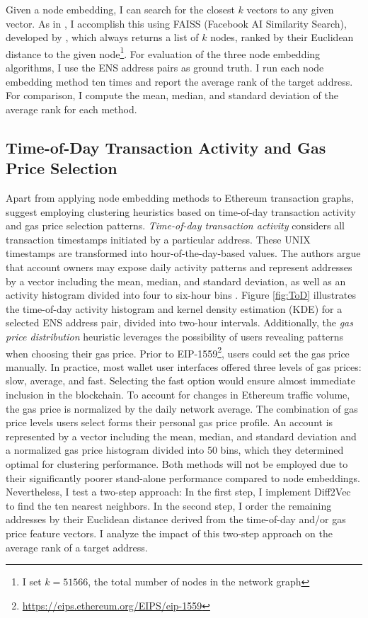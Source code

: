 \documentclass[12pt,a4paper,titlepage,oneside,english]{article}
\begin{document}
Given a node embedding, I can search for the closest $k$ vectors to any given vector. As in \cite{wu2022tutela}, I accomplish this using FAISS (Facebook AI Similarity Search), developed by \cite{johnson2019faiss}, which always returns a list of $k$ nodes, ranked by their Euclidean distance to the given node\footnote{I set $k = 51566$, the total number of nodes in the network graph}. \newline
For evaluation of the three node embedding algorithms, I use the ENS address pairs as ground truth. I run each node embedding method ten times and report the average rank of the target address. For comparison, I compute the mean, median, and standard deviation of the average rank for each method.

\subsection{Time-of-Day Transaction Activity and Gas Price Selection}
Apart from applying node embedding methods to Ethereum transaction graphs, \cite{Beres2020} suggest employing clustering heuristics based on time-of-day transaction activity and gas price selection patterns. \newline
\textit{Time-of-day transaction activity} considers all transaction timestamps initiated by a particular address. These UNIX timestamps are transformed into hour-of-the-day-based values. The authors argue that account owners may expose daily activity patterns and represent addresses by a vector including the mean, median, and standard deviation, as well as an activity histogram divided into four to six-hour bins \citep{Beres2020}.  Figure \ref{fig:ToD} illustrates the time-of-day activity histogram and kernel density estimation (KDE) for a selected ENS address pair, divided into two-hour intervals.\newline
Additionally, the \textit{gas price distribution} heuristic leverages the possibility of users revealing patterns when choosing their gas price. Prior to EIP-1559\footnote{\url{https://eips.ethereum.org/EIPS/eip-1559}}, users could set the gas price manually. In practice, most wallet user interfaces offered three levels of gas prices: slow, average, and fast. Selecting the fast option would ensure almost immediate inclusion in the blockchain. To account for changes in Ethereum traffic volume, the gas price is normalized by the daily network average. The combination of gas price levels users select forms their personal gas price profile. An account is represented by a vector including the mean, median, and standard deviation and a normalized gas price histogram divided into 50 bins, which they determined optimal for clustering performance. \citep{Beres2020} \newline
Both methods will not be employed due to their significantly poorer stand-alone performance compared to node embeddings. Nevertheless, I test a two-step approach: In the first step, I implement Diff2Vec to find the ten nearest neighbors. In the second step, I order the remaining addresses by their Euclidean distance derived from the time-of-day and/or gas price feature vectors. I analyze the impact of this two-step approach on the average rank of a target address.
\end{document}
